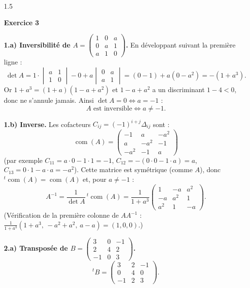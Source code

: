 \documentclass[12pt]{article}
\begin{document}
\begin{spacing}{1.5}

\medskip\textbf{Exercice 3}

\textbf{1.a) Inversibilité de $A=\begin{pmatrix}1&0&a\\0&a&1\\a&1&0\end{pmatrix}$.} En développant suivant la première ligne :
\[
\det A=1\cdot\begin{vmatrix}a&1\\1&0\end{vmatrix}-0+a\begin{vmatrix}0&a\\a&1\end{vmatrix}=(0-1)+a(0-a^2)=-(1+a^3).
\]
Or $1+a^3=(1+a)(1-a+a^2)$ et $1-a+a^2$ a un discriminant $1-4<0$, donc ne s'annule jamais. Ainsi $\det A=0\iff a=-1$ :
\[
\boxed{A\text{ est inversible}\iff a\neq-1}.
\]

\textbf{1.b) Inverse.} Les cofacteurs $C_{ij}=(-1)^{i+j}\Delta_{ij}$ sont :
\[
\operatorname{com}(A)=\begin{pmatrix}-1&a&-a^2\\a&-a^2&-1\\-a^2&-1&a\end{pmatrix}
\]
(par exemple $C_{11}=a\cdot0-1\cdot1=-1$, $C_{12}=-(0\cdot0-1\cdot a)=a$, $C_{13}=0\cdot1-a\cdot a=-a^2$). Cette matrice est symétrique (comme $A$), donc ${}^t\operatorname{com}(A)=\operatorname{com}(A)$ et, pour $a\neq-1$ :
\[
A^{-1}=\frac{1}{\det A}\,{}^t\operatorname{com}(A)=\boxed{\frac{1}{1+a^3}\begin{pmatrix}1&-a&a^2\\-a&a^2&1\\a^2&1&-a\end{pmatrix}}.
\]
(Vérification de la première colonne de $AA^{-1}$ : $\frac{1}{1+a^3}(1+a^3,\ -a^2+a^2,\ a-a)=(1,0,0)$.)

\textbf{2.a) Transposée de $B=\begin{pmatrix}3&0&-1\\2&4&2\\-1&0&3\end{pmatrix}$.}
\[
{}^tB=\begin{pmatrix}3&2&-1\\0&4&0\\-1&2&3\end{pmatrix}.
\]


\end{spacing}
\end{document}
